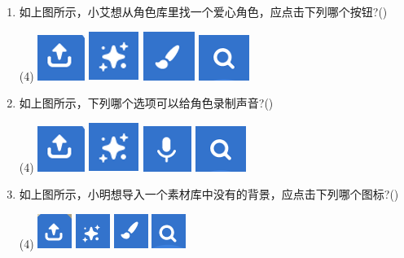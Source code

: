\documentclass[10pt, a4paper]{article}
\begin{document}
\begin{enumerate}
        \item 如上图所示，小艾想从角色库里找一个爱心角色，应点击下列哪个按钮?(\qquad)
        \begin{tasks}(4)
            \task \includegraphics[width=.03\textwidth]{22a.png}
            \task \includegraphics[width=.03\textwidth]{22b.png}
            \task \includegraphics[width=.03\textwidth]{22c.png}
            \task \includegraphics[width=.03\textwidth]{22d.png}
        \end{tasks}

        \item 如上图所示，下列哪个选项可以给角色录制声音?(\qquad)
        \begin{tasks}(4)
            \task \includegraphics[width=.03\textwidth]{23a.png}
            \task \includegraphics[width=.03\textwidth]{23b.png}
            \task \includegraphics[width=.03\textwidth]{23c.png}
            \task \includegraphics[width=.03\textwidth]{23d.png}
        \end{tasks}

        \item 如上图所示，小明想导入一个素材库中没有的背景，应点击下列哪个图标?(\qquad)
        \begin{tasks}(4)
            \task \includegraphics[width=.03\textwidth]{24a.png}
            \task \includegraphics[width=.03\textwidth]{24b.png}
            \task \includegraphics[width=.03\textwidth]{24c.png}
            \task \includegraphics[width=.03\textwidth]{24d.png}
        \end{tasks}


\end{enumerate}
\end{document}
